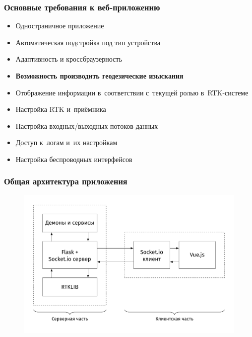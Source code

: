 \documentclass[xetex,с,aspectratio=169]{beamer}
\begin{document}
%
%
\begin{frame}
  \frametitle{Основные требования к веб-приложению}
  
  \begin{itemize}
    \item Одностраничное приложение
    \item Автоматическая подстройка под тип устройства
    \item Адаптивность и кроссбраузерность
  \end{itemize}
  \begin{center}
    \vskip -0.7cm
    \color{ifmoblue}{\rule{.5\textwidth}{0.5pt}}
  \end{center}
  \vskip -0.5cm
  \begin{itemize}
    \item \textbf{Возможность производить геодезические изыскания}
    \item Отображение информации в~соответствии с~текущей ролью в~RTK-системе
    \item Настройка RTK и~приёмника
    \item Настройка входных/выходных потоков данных
    \item Доступ к~логам и~их настройкам
    \item Настройка беспроводных интерфейсов
  \end{itemize}
\end{frame}


%
%
\begin{frame}
  \frametitle{Общая архитектура приложения}
  \vskip -0.5cm
  \begin{figure}[h]
    \centering
    \includegraphics[width=.75\textwidth]{../img/tikz/system-architecture/pic_sans_no-border}
  \end{figure}
\end{frame}
\end{document}
